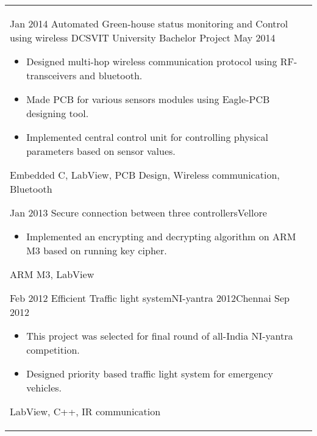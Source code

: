 \begin{longtable}{R{2.5cm}|p{14.8cm}}
	\experience
	{Jan 2014} {Automated Green-house status monitoring and Control using wireless DCS}{VIT University} {Bachelor Project}
	{May 2014}	{
		\begin{itemize}
			\item Designed multi-hop wireless communication protocol using RF-transceivers and bluetooth.
			\item Made PCB for various sensors modules using Eagle-PCB designing tool.
			\item Implemented central control unit for controlling physical parameters based on sensor values.
		\end{itemize}
	}	{Embedded C, LabView, PCB Design, Wireless communication, Bluetooth}

	\experience
	{Jan 2013} {Secure connection between three controllers}{Vellore}{}
	{}	{
		\begin{itemize}
			\item Implemented an encrypting and decrypting algorithm on ARM M3 based on running key cipher.
		\end{itemize}
	}	{ARM M3, LabView }

	\experience 
	{Feb 2012} {Efficient Traffic light system}{NI-yantra 2012}{Chennai}
	{Sep 2012}	{
		\begin{itemize}
			\item This project was selected for final round of all-India NI-yantra competition.
			\item Designed priority based traffic light system for emergency vehicles.
		\end{itemize}	
	}	{LabView, C++, IR communication }

\end{longtable}

